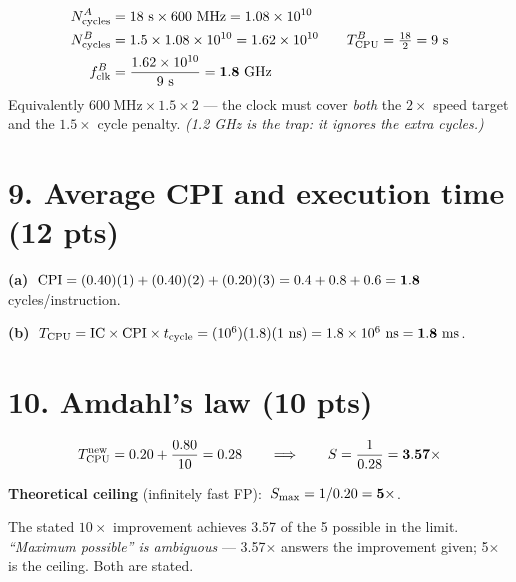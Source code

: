\begin{align*}
  N_{\mathrm{cycles}}^{A} &= 18\ \text{s} \times 600\ \text{MHz} = 1.08\times10^{10} \\
  N_{\mathrm{cycles}}^{B} &= 1.5 \times 1.08\times10^{10} = 1.62\times10^{10}
     \qquad T_{\mathrm{CPU}}^{B} = \tfrac{18}{2} = 9\ \text{s} \\
  f_{\mathrm{clk}}^{B} &= \frac{1.62\times10^{10}}{9\ \text{s}}
     = \mathbf{1.8\ \text{GHz}}
\end{align*}
Equivalently $600\ \text{MHz} \times 1.5 \times 2$ — the clock must cover
\emph{both} the $2\times$ speed target and the $1.5\times$ cycle penalty.
\emph{(1.2 GHz is the trap: it ignores the extra cycles.)}

\section*{9. Average CPI and execution time \normalsize(12 pts)}

\textbf{(a)} $\;\mathrm{CPI} = (0.40)(1) + (0.40)(2) + (0.20)(3) = 0.4+0.8+0.6
  = \mathbf{1.8}$ cycles/instruction.

\noindent\textbf{(b)} $\;T_{\mathrm{CPU}} = \mathrm{IC} \times \mathrm{CPI} \times t_{\mathrm{cycle}}
  = (10^{6})(1.8)(1\ \text{ns}) = 1.8\times10^{6}\ \text{ns}
  = \mathbf{1.8\ \text{ms}}$.

\section*{10. Amdahl's law \normalsize(10 pts)}

$$T_{\mathrm{CPU}}^{\text{new}} = 0.20 + \frac{0.80}{10} = 0.28
\qquad\Longrightarrow\qquad
S = \frac{1}{0.28} = \mathbf{3.57\times}$$

\textbf{Theoretical ceiling} (infinitely fast FP): $\;S_{\max}
= 1/0.20 = \mathbf{5\times}$.

{\small The stated $10\times$ improvement achieves 3.57 of the 5 possible in the
limit. \emph{``Maximum possible'' is ambiguous} — 3.57$\times$ answers the
improvement given; 5$\times$ is the ceiling. Both are stated.}


